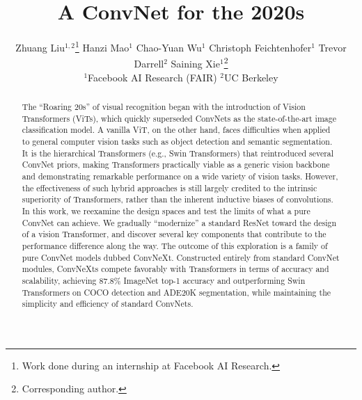 \documentclass[10pt,twocolumn,letterpaper]{article}
\newcommand{\authorskip}{\hspace{2.5mm}}
\begin{document}
\title{A ConvNet for the 2020s}
\author{\hspace{-2ex} Zhuang Liu$^{1,2}$\thanks{Work done during an internship at Facebook AI Research.} \authorskip Hanzi Mao$^{1}$ \authorskip Chao-Yuan Wu$^{1}$ \authorskip Christoph Feichtenhofer$^{1}$ \authorskip Trevor Darrell$^{2}$ \authorskip Saining Xie$^{1}$\thanks{Corresponding author.} \\[2mm]
\hspace{-2ex}$^1$Facebook AI Research (FAIR) \quad $^2$UC Berkeley}
 \maketitle
	
	
	\newcommand{\convcolor}[1]{\textcolor{convcolor}{#1}}
	\newcommand{\vitcolor}[1]{\textcolor{vitcolor}{#1}}
	\newcommand{\cnn}{ConvNeXt}

	
	\newcommand{\vb}{\vitcolor{$\mathbf{\circ}$\,}}
    \newcommand{\cb}{\convcolor{$\bullet$\,}}
    \newcommand{\gr}{\rowcolor[gray]{.95}}

\begin{abstract}
The ``Roaring 20s'' of visual recognition began with the introduction of Vision Transformers (ViTs), which quickly superseded ConvNets as the state-of-the-art image classification model. A vanilla ViT, on the other hand, faces difficulties when applied to general computer vision tasks such as object detection and semantic segmentation. It is the hierarchical Transformers (e.g., Swin Transformers) that reintroduced several ConvNet priors, making Transformers practically viable as a generic vision backbone and demonstrating remarkable performance on a wide variety of vision tasks. However, the effectiveness of such hybrid approaches is still largely credited to the intrinsic superiority of Transformers, rather than the inherent inductive biases of convolutions. In this work, we reexamine the design spaces and test the limits of what a pure ConvNet can achieve. We gradually ``modernize'' a standard ResNet toward the design of a vision Transformer, and discover several key components that contribute to the performance difference along the way. The outcome of this exploration is a family of pure ConvNet models dubbed ConvNeXt. Constructed entirely from standard ConvNet modules, ConvNeXts compete favorably with Transformers in terms of accuracy and scalability, achieving 87.8\% ImageNet top-1 accuracy and outperforming Swin Transformers on COCO detection and ADE20K segmentation, while maintaining the simplicity and efficiency of standard ConvNets. 
\end{abstract}
\end{document}
